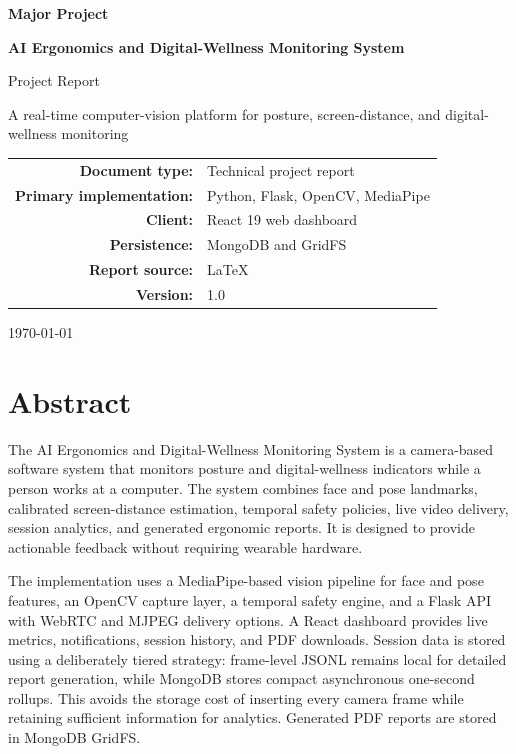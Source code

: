 \documentclass[12pt,a4paper]{report}
\newcommand{\systemname}{AI Ergonomics and Digital-Wellness Monitoring System}
\begin{document}
\begin{titlepage}
\centering
\vspace*{1cm}
{\Large\bfseries Major Project\par}
\vspace{1.5cm}
{\Huge\bfseries \systemname\par}
\vspace{0.7cm}
{\Large Project Report\par}
\vspace{1.5cm}
\par
\vspace{1.2cm}
{\large A real-time computer-vision platform for posture, screen-distance, and digital-wellness monitoring\par}
\vfill
\begin{tabular}{rl}
\textbf{Document type:} & Technical project report\\
\textbf{Primary implementation:} & Python, Flask, OpenCV, MediaPipe\\
\textbf{Client:} & React 19 web dashboard\\
\textbf{Persistence:} & MongoDB and GridFS\\
\textbf{Report source:} & LaTeX\\
\textbf{Version:} & 1.0\\
\end{tabular}
\vfill
{\large \today\par}
\end{titlepage}

\chapter*{Abstract}
The \systemname{} is a camera-based software system that monitors posture and
digital-wellness indicators while a person works at a computer. The system
combines face and pose landmarks, calibrated screen-distance estimation,
temporal safety policies, live video delivery, session analytics, and generated
ergonomic reports. It is designed to provide actionable feedback without
requiring wearable hardware.

The implementation uses a MediaPipe-based vision pipeline for face and pose
features, an OpenCV capture layer, a temporal safety engine, and a Flask API
with WebRTC and MJPEG delivery options. A React dashboard provides live
metrics, notifications, session history, and PDF downloads. Session data is
stored using a deliberately tiered strategy: frame-level JSONL remains local
for detailed report generation, while MongoDB stores compact asynchronous
one-second rollups. This avoids the storage cost of inserting every camera
frame while retaining sufficient information for analytics. Generated PDF
reports are stored in MongoDB GridFS.
\end{document}
